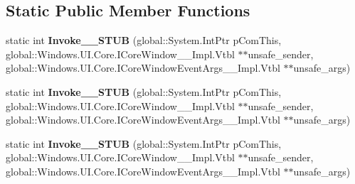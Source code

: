 \subsection*{Static Public Member Functions}
\begin{DoxyCompactItemize}
\item 
\mbox{\label{struct_windows_1_1_foundation_1_1_typed_event_handler___a___windows___u_i___core___core_window__f96fd82f4e79c9942232efb7e426aa23_ae033b486d975fc144c48cf15ed334f94}} 
static int {\bfseries Invoke\+\_\+\+\_\+\+S\+T\+UB} (global\+::\+System.\+Int\+Ptr p\+Com\+This, global\+::\+Windows.\+U\+I.\+Core.\+I\+Core\+Window\+\_\+\+\_\+\+Impl.\+Vtbl $\ast$$\ast$unsafe\+\_\+sender, global\+::\+Windows.\+U\+I.\+Core.\+I\+Core\+Window\+Event\+Args\+\_\+\+\_\+\+Impl.\+Vtbl $\ast$$\ast$unsafe\+\_\+args)
\item 
\mbox{\label{struct_windows_1_1_foundation_1_1_typed_event_handler___a___windows___u_i___core___core_window__f96fd82f4e79c9942232efb7e426aa23_ae033b486d975fc144c48cf15ed334f94}} 
static int {\bfseries Invoke\+\_\+\+\_\+\+S\+T\+UB} (global\+::\+System.\+Int\+Ptr p\+Com\+This, global\+::\+Windows.\+U\+I.\+Core.\+I\+Core\+Window\+\_\+\+\_\+\+Impl.\+Vtbl $\ast$$\ast$unsafe\+\_\+sender, global\+::\+Windows.\+U\+I.\+Core.\+I\+Core\+Window\+Event\+Args\+\_\+\+\_\+\+Impl.\+Vtbl $\ast$$\ast$unsafe\+\_\+args)
\item 
\mbox{\label{struct_windows_1_1_foundation_1_1_typed_event_handler___a___windows___u_i___core___core_window__f96fd82f4e79c9942232efb7e426aa23_ae033b486d975fc144c48cf15ed334f94}} 
static int {\bfseries Invoke\+\_\+\+\_\+\+S\+T\+UB} (global\+::\+System.\+Int\+Ptr p\+Com\+This, global\+::\+Windows.\+U\+I.\+Core.\+I\+Core\+Window\+\_\+\+\_\+\+Impl.\+Vtbl $\ast$$\ast$unsafe\+\_\+sender, global\+::\+Windows.\+U\+I.\+Core.\+I\+Core\+Window\+Event\+Args\+\_\+\+\_\+\+Impl.\+Vtbl $\ast$$\ast$unsafe\+\_\+args)
\item 
\mbox{\label{struct_windows_1_1_foundation_1_1_typed_event_handler___a___windows___u_i___core___core_window__f96fd82f4e79c9942232efb7e426aa23_ae033b486d975fc144c48cf15ed334f94}} 

\end{DoxyCompactItemize}
